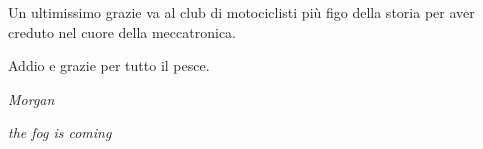 \begin{acknowledgements}
Un ultimissimo grazie va al club di motociclisti più figo della storia per aver creduto nel cuore della meccatronica.

Addio e grazie per tutto il pesce.

\textit{Morgan}\\


\begin{center}
    \textcolor{mygrey}{\textit{the fog is coming}}
\end{center}


\end{acknowledgements}